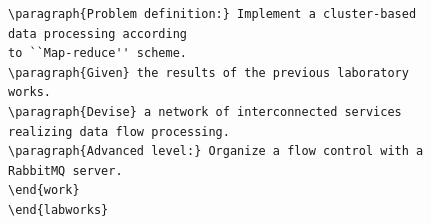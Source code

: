 \documentclass[ 

]{aiitart}
\begin{document}
\begin{figure}
\begin{verbatim}
\paragraph{Problem definition:} Implement a cluster-based data processing according
to ``Map-reduce'' scheme.
\paragraph{Given} the results of the previous laboratory works.
\paragraph{Devise} a network of interconnected services realizing data flow processing.
\paragraph{Advanced level:} Organize a flow control with a RabbitMQ server.
\end{work}
\end{labworks}
\end{verbatim}



\end{figure}
\end{document}
